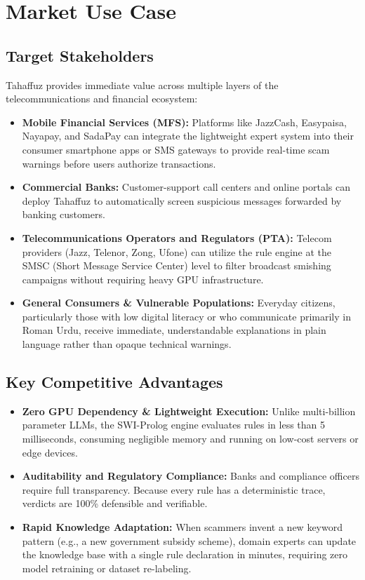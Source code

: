 \documentclass[11pt,a4paper]{article}
\begin{document}
\bigskip

\section{Market Use Case}

\subsection{Target Stakeholders}
Tahaffuz provides immediate value across multiple layers of the telecommunications and financial ecosystem:
\begin{itemize}
    \item \textbf{Mobile Financial Services (MFS):} Platforms like JazzCash, Easypaisa, Nayapay, and SadaPay can integrate the lightweight expert system into their consumer smartphone apps or SMS gateways to provide real-time scam warnings before users authorize transactions.
    \item \textbf{Commercial Banks:} Customer-support call centers and online portals can deploy Tahaffuz to automatically screen suspicious messages forwarded by banking customers.
    \item \textbf{Telecommunications Operators and Regulators (PTA):} Telecom providers (Jazz, Telenor, Zong, Ufone) can utilize the rule engine at the SMSC (Short Message Service Center) level to filter broadcast smishing campaigns without requiring heavy GPU infrastructure.
    \item \textbf{General Consumers \& Vulnerable Populations:} Everyday citizens, particularly those with low digital literacy or who communicate primarily in Roman Urdu, receive immediate, understandable explanations in plain language rather than opaque technical warnings.
\end{itemize}

\subsection{Key Competitive Advantages}
\begin{itemize}
    \item \textbf{Zero GPU Dependency \& Lightweight Execution:} Unlike multi-billion parameter LLMs, the SWI-Prolog engine evaluates rules in less than 5 milliseconds, consuming negligible memory and running on low-cost servers or edge devices.
    \item \textbf{Auditability and Regulatory Compliance:} Banks and compliance officers require full transparency. Because every rule has a deterministic trace, verdicts are 100\% defensible and verifiable.
    \item \textbf{Rapid Knowledge Adaptation:} When scammers invent a new keyword pattern (e.g., a new government subsidy scheme), domain experts can update the knowledge base with a single rule declaration in minutes, requiring zero model retraining or dataset re-labeling.
\end{itemize}
\end{document}
